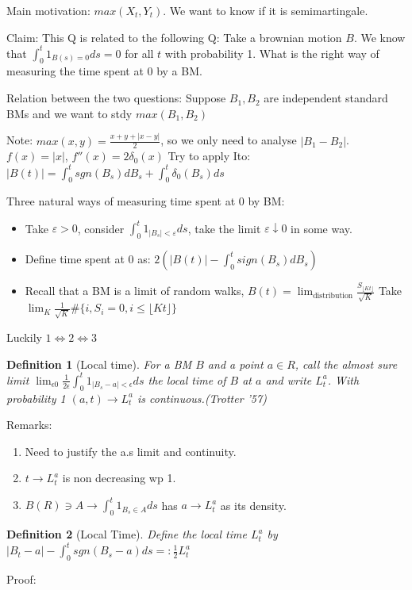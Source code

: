 \documentclass{article}
\newtheorem{definition}{Definition}
\begin{document}
Main motivation:
$max(X_t, Y_t)$. We want to know if it is semimartingale.

Claim:
This Q is related to the following Q:
Take a brownian motion $B$. We know that $\int_0^t 1_{B(s) = 0}ds = 0$ for all $t$ with probability 1.
What is the right way of measuring the time spent at 0 by a BM.

Relation between the two questions:
Suppose $B_1, B_2$ are independent standard BMs and we want to stdy $max(B_1, B_2)$


Note: $max(x, y) = \frac{x+y + |x-y|}{2}$, so we only need to analyse $|B_1 - B_2|$. $f(x) = |x|$, $f''(x) = 2\delta_0(x)$
Try to apply Ito: $|B(t)| = \int_0^t sgn(B_s) dB_s + \int_0^t \delta_0(B_s) ds$


Three natural ways of measuring time spent at 0 by BM:
\begin{itemize}
\item Take $\varepsilon > 0$, consider $\int_0^t 1_{|B_s| < \varepsilon} ds$, take the limit $\varepsilon \downarrow 0$ in some way.
\item Define time spent at 0 as: $2(|B(t)| - \int_0^t sign(B_s) dB_s)$
\item Recall that a BM is a limit of random walks, $B(t) = \lim_{\text{distribution}} \frac{S_{\lfloor Kt \rfloor}}{\sqrt K}$
  Take $\lim_K \frac1{\sqrt K}\# \{ i, S_i = 0, i \le \lfloor Kt \rfloor \}$
\end{itemize}

Luckily $1 \iff 2 \iff 3$

\begin{definition}[Local time]
  For a BM $B$ and a point $a \in R$, call the almost sure limit $\lim_{\epsilon 0} \frac{1}{2\epsilon} \int_0^t 1_{|B_s - a| < \epsilon}ds$ the local time of $B$ at $a$ and write $L_t^a$.
  With probability 1 $(a, t) \rightarrow L_t^a$ is continuous.(Trotter '57)
\end{definition}

Remarks:
\begin{enumerate}
\item Need to justify the a.s limit and continuity.
\item $t \rightarrow L_t^a$ is non decreasing wp 1.
\item $B(R) \ni A \rightarrow \int_0^t 1_{B_s \in A}ds$  has $a \rightarrow L_t^a$ as its density.
\end{enumerate}

\begin{definition}[Local Time]
  Define the local time $L_t^a$ by $|B_t-a| - \int_0^t sgn(B_s-a)ds =: \frac12 L_t^a$
\end{definition}
Proof:
\end{document}
